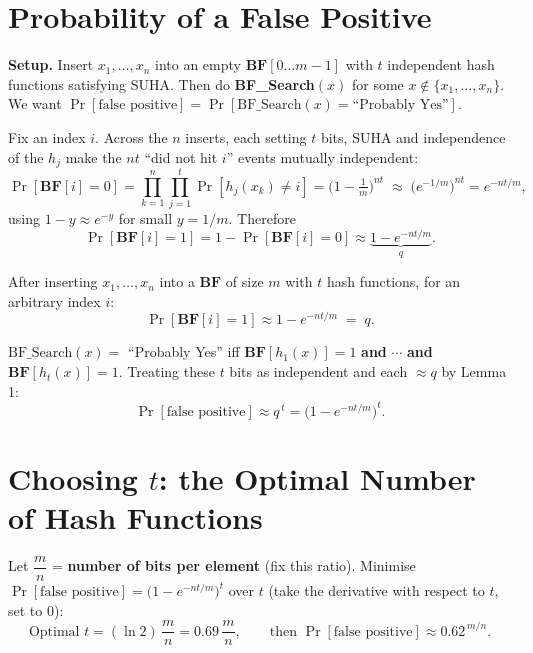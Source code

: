 \documentclass[11pt]{article}
\begin{document}
\section{Probability of a False Positive}

\textbf{Setup.} Insert $x_1, \ldots, x_n$ into an empty $\mathbf{BF}[0 \ldots m-1]$ with $t$ independent hash functions satisfying SUHA. Then do \textbf{BF\_Search}$(x)$ for some $x \notin \{x_1, \ldots, x_n\}$. We want $\Pr[\text{false positive}] = \Pr[\text{BF\_Search}(x) = \text{``Probably Yes''}]$.

\begin{keybox}
Fix an index $i$. Across the $n$ inserts, each setting $t$ bits, SUHA and independence of the $h_j$ make the $nt$ ``did not hit $i$'' events mutually independent:
\[
  \Pr[\mathbf{BF}[i] = 0]
  = \prod_{k=1}^{n}\prod_{j=1}^{t} \Pr[h_j(x_k) \ne i]
  = \Big(1 - \tfrac{1}{m}\Big)^{nt}
  \;\approx\; \big(e^{-1/m}\big)^{nt}
  = e^{-nt/m},
\]
using $1 - y \approx e^{-y}$ for small $y = 1/m$. Therefore
\[
  \Pr[\mathbf{BF}[i] = 1] = 1 - \Pr[\mathbf{BF}[i]=0] \approx \underbrace{1 - e^{-nt/m}}_{q}.
\]
\end{keybox}

\begin{keybox}[Lemma 1]
After inserting $x_1, \ldots, x_n$ into a $\mathbf{BF}$ of size $m$ with $t$ hash functions, for an arbitrary index $i$:
\[
  \Pr[\mathbf{BF}[i] = 1] \approx 1 - e^{-nt/m} \;=\; q.
\]
\end{keybox}

\begin{keybox}
$\text{BF\_Search}(x) = $ ``Probably Yes'' iff $\mathbf{BF}[h_1(x)] = 1$ \textbf{and} $\cdots$ \textbf{and} $\mathbf{BF}[h_t(x)] = 1$. Treating these $t$ bits as independent and each $\approx q$ by Lemma 1:
\[
  \Pr[\text{false positive}]
  \approx q^{\,t}
  = \Big(1 - e^{-nt/m}\Big)^{t}.
\]
\end{keybox}

\section{Choosing $t$: the Optimal Number of Hash Functions}

\begin{keybox}[Optimal $t$]
Let $\dfrac{m}{n}$ = \textbf{number of bits per element} (fix this ratio). Minimise $\Pr[\text{false positive}] = \big(1 - e^{-nt/m}\big)^t$ over $t$ (take the derivative with respect to $t$, set to $0$):
\[
  \text{Optimal } t = (\ln 2)\,\frac{m}{n} = 0.69\,\frac{m}{n},
  \qquad
  \text{then } \Pr[\text{false positive}] \approx 0.62^{\,m/n}.
\]
\end{keybox}
\end{document}
